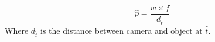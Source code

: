 \begin{equation}
\hat{p} = \frac{w \times f}{d_{\hat{t}}}
\end{equation}
Where $d_{\hat{t}}$ is the distance between camera and object at $\hat{t}$.

